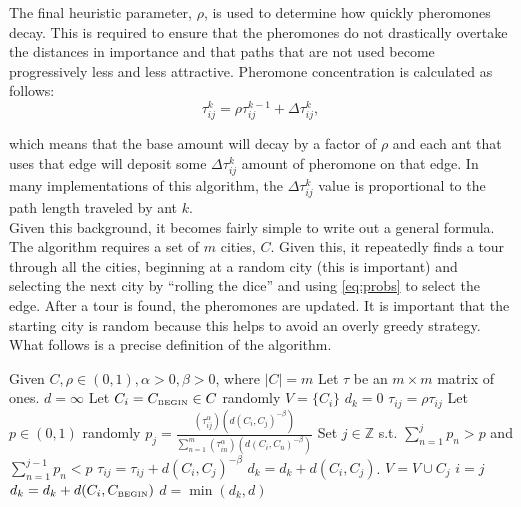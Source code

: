 \documentclass[twocolumn]{article}
\begin{document}
The final heuristic parameter, $\rho$, is used to 
determine how quickly pheromones decay. This is required to ensure that the pheromones do not
drastically overtake the distances in importance and that paths that are not used become 
progressively less and less attractive. Pheromone concentration is calculated as follows:
\begin{equation}
\tau^k_{ij} = \rho \tau^{k-1}_{ij} + \Delta \tau^k_{ij}, \label{eq:phers}
\end{equation}

which means that the base amount will decay by a factor of $\rho$ and each ant
that uses that edge will deposit some $\Delta\tau^k_{ij}$ amount of pheromone on
that edge. In many implementations of this algorithm, the $\Delta\tau^k_{ij}$
value is proportional to the path length traveled by ant $k$. \\ %

Given this background, it becomes fairly simple to write out a general 
formula. The algorithm requires a set of $m$ cities, $C$. Given this, 
it repeatedly finds a tour through all the cities, beginning at a random city
(this is important) and selecting the next city by ``rolling the dice'' and
using \eqref{eq:probs} to select the edge. After a tour is found, the 
pheromones are updated. It is important that the starting city is random 
because this helps to avoid an overly greedy strategy. What follows is a
precise definition of the algorithm. \\

\begin{algorithmic}
  \State Given $C, \rho \in (0,1), \alpha > 0, \beta > 0$, where $|C| = m$
  \State Let $\tau$ be an $m \times m$ matrix of ones.
  \State $d = \infty$
    \State Let $C_i = C_{\mbox{{\tiny BEGIN}}}\in C$ randomly
    \State $V = \{ C_i \}$
    \State $d_k = 0$
    \State $\tau_{ij} = \rho \tau_{ij}$
       \State Let $p \in (0,1)$ randomly
       \State $\displaystyle p_j = \frac{(\tau_{ij}^\alpha)(d(C_i,C_j)^{-\beta})}{\sum_{n=1}^m 
         (\tau_{in}^\alpha) (d(C_i,C_n)^{-\beta})}$
       \State Set $j \in \mathbb{Z}$ s.t. $\displaystyle \sum_{n=1}^j p_n > p$ and 
       $\displaystyle \sum_{n=1}^{j-1} p_n < p$
       \State $\tau_{ij} = \tau_{ij} + d(C_i,C_j)^{-\beta}$
       \State $d_k = d_k + d(C_i,C_j)$.
       \State $V = V \cup C_j$
       \State $i = j$
    \EndWhile
    \State $d_k = d_k + d(C_i,C_{\mbox{{\tiny BEGIN}}})$
    \State $d = \min (d_k, d)$
  \EndFor \\
\end{algorithmic}
\end{document}
